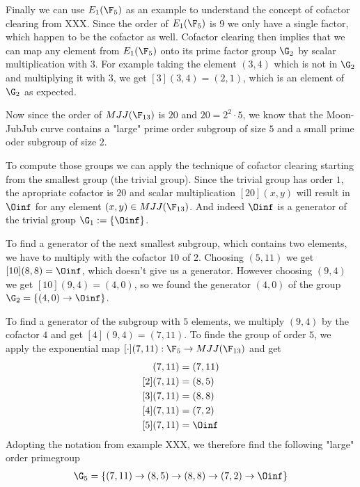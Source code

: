 \begin{example}
Finally we can use $E_1(\F_5)$ as an example to understand the concept of cofactor clearing from XXX. Since the order of $E_1(\F_5)$ is $9$ we only have a single factor, which happen to be the cofactor as well. Cofactor clearing then implies that we can map any element from $E_1(\F_5)$ onto its prime factor group $\G_2$ by scalar multiplication with $3$. For example taking the element $(3,4)$ which is not in $\G_2$ and multiplying it with $3$, we get $[3](3,4)= (2,1)$, which is an element of $\G_2$ as expected.
\end{example}
\begin{example}
Now since the order of $MJJ(\F_{13})$ is $20$ and $20 = 2^2\cdot 5$, we know that the Moon-JubJub curve contains a "large" prime order subgroup of size $5$ and a small prime oder subgroup of size $2$. 

To compute those groups we can apply the technique of cofactor clearing starting from the smallest group (the trivial group). Since the trivial group has order $1$, the apropriate cofactor is $20$ and scalar multiplication $[20](x,y)$ will result in $\Oinf$ for any element $(x,y)\in MJJ(\F_{13})$. And indeed $\Oinf$ is a generator of the trivial group $\G_1 :=\{\Oinf\}$. 

To find a generator of the next smallest subgroup, which contains two elements, we have to multiply with the cofactor $10$ of $2$. Choosing $(5,11)$ we get 
$[10](8,8)=\Oinf$, which doesn't give us a generator. However choosing $(9,4)$ we get $[10](9,4)=(4,0)$, so we found the generator $(4,0)$ of the group $\G_2=\{(4,0)\to \Oinf\}$. 

To find a generator of the subgroup with $5$ elements, we multiply $(9,4)$ by the cofactor $4$ and get $[4](9,4)=(7,11)$. To finde the group of order $5$, we apply the exponential map $[\cdot](7,11): \F_5 \to MJJ(\F_{13})$ and get
\begin{align*}
[1](7,11) &= (7,11)\\
[2](7,11) &= (8,5)\\
[3](7,11) &= (8,8)\\
[4](7,11) &= (7,2)\\
[5](7,11) &= \Oinf\\
\end{align*} 
Adopting the notation from example XXX, we therefore find the following "large" order primegroup
\begin{multline*}
\G_5 = \{(7,11)\to(8,5)\to(8,8)\to(7,2)\to \Oinf\}
\end{multline*}
\end{example}
